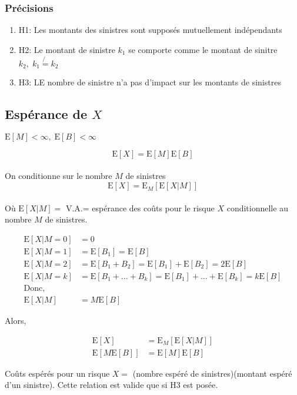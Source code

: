 \subsubsection*{Précisions}\label{precisions}

\begin{enumerate}
\item H1: Les montants des sinistres sont supposés mutuellement indépendants    
\item H2: Le montant de sinistre $k_1$ se comporte comme le montant de sinitre $k_2,\;k_1 \not{=} k_2$  
\item H3: LE nombre de sinistre n'a pas d'impact sur les montants de sinistres  
\end{enumerate}

\subsection{Espérance de \(X\)}\label{esperance-de-x}

\(\text{E}[M]<\infty,\; \text{E}[B]<\infty\)

\[\text{E}[X]=\text{E}[M]\text{E}[B]\]\\
On conditionne sur le nombre \(M\) de sinistres \[
\text{E}[X]=\text{E}_M\left[\text{E}[X|M]\right]
\]\\
Où \(\text{E}[X|M]=\) V.A.= espérance des coûts pour le risque \(X\)
conditionnelle au nombre \(M\) de sinistres.

\begin{align*}
\text{E}[X|M=0]& =0\\
\text{E}[X|M=1]& = \text{E}[B_1]=\text{E}[B]\\
\text{E}[X|M=2]& = \text{E}[B_1+B_2]=\text{E}[B_1]+\text{E}[B_2]=2\text{E}[B]\\
\text{E}[X|M=k]& = \text{E}[B_1+\dots+B_k]=\text{E}[B_1]+\dots+\text{E}[B_k]=k\text{E}[B]\\
\text{Donc,}\\
\text{E}[X|M]& =M\text{E}[B]
\end{align*}

Alors,

\begin{align*}
\text{E}[X]& =\text{E}_M\left[\text{E}[X|M]\right]\\
\text{E}\left[M\text{E}[B]\right]& =\text{E}[M]\text{E}[B]
\end{align*}

Coûts espérés pour un risque \(X=\) (nombre espéré de sinistres)(montant
espéré d'un sinistre). Cette relation est valide que si H3 est posée.

